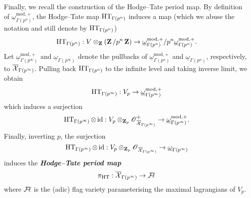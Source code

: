 Finally, we recall the construction of the Hodge--Tate period map. By definition of $\underline{\omega}^{\text{mod},+}_{\Gamma(p^n)}$, the Hodge--Tate map $\operatorname{HT}_{\Gamma(p^n)}$ induces a map (which we abuse the notation and still denote by $\operatorname{HT}_{\Gamma(p^n)}$)
$$\operatorname{HT}_{\Gamma(p^n)}: V\otimes_{\operatorname{\mathbf{Z}}}(\operatorname{\mathbf{Z}}/p^n\operatorname{\mathbf{Z}})\rightarrow \underline{\omega}^{\text{mod},+}_{\Gamma(p^n)}/p^n\underline{\omega}^{\text{mod},+}_{\Gamma(p^n)}.$$ 
Let $\underline{\omega}^{\text{mod},+}_{\Gamma(p^{\infty})}$ and $\underline{\omega}_{\Gamma(p^{\infty})}$ denote the pullbacks of $\underline{\omega}^{\text{mod},+}_{\Gamma(p^n)}$ and $\underline{\omega}_{\Gamma(p^n)}$, respectively, to $\overline{\operatorname{\mathcal{X}}}_{\Gamma(p^{\infty})}$. Pulling back $\operatorname{HT}_{\Gamma(p^n)}$ to the infinite level and taking inverse limit, we obtain 
$$\operatorname{HT}_{\Gamma(p^{\infty})}: V_p\rightarrow \underline{\omega}^{\text{mod},+}_{\Gamma(p^{\infty})}$$
which induces a surjection
$$\operatorname{HT}_{\Gamma(p^{\infty})}\otimes \operatorname{id}: V_p\otimes_{\operatorname{\mathbf{Z}}_p} \operatorname{\mathscr{O}}^+_{\overline{\operatorname{\mathcal{X}}}_{\Gamma(p^{\infty})}}\rightarrow \underline{\omega}^{\text{mod},+}_{\Gamma(p^{\infty})}.$$
Finally, inverting $p$, the surjection
$$\operatorname{HT}_{\Gamma(p^{\infty})}\otimes \operatorname{id}: V_p\otimes_{\operatorname{\mathbf{Z}}_p} \operatorname{\mathscr{O}}_{\overline{\operatorname{\mathcal{X}}}_{\Gamma(p^{\infty})}}\rightarrow \underline{\omega}_{\Gamma(p^{\infty})}$$
induces the \textbf{\textit{Hodge--Tate period map}}
$$\pi_{\operatorname{HT}}: \overline{\operatorname{\mathcal{X}}}_{\Gamma(p^{\infty})}\rightarrow \operatorname{\mathcal{F}\!\mathbf{\ell}}$$
where $\operatorname{\mathcal{F}\!\mathbf{\ell}}$ is the (adic) flag variety parameterising the maximal lagrangians of $V_p$.
